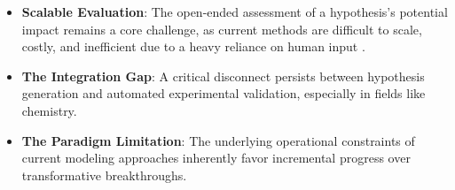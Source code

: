 \begin{itemize}
    \item \textbf{Scalable Evaluation}: The open-ended assessment of a hypothesis's potential impact remains a core challenge, as current methods are difficult to scale, costly, and inefficient due to a heavy reliance on human input \autocite{nie2025assessing}.
    \item \textbf{The Integration Gap}: A critical disconnect persists between hypothesis generation and automated experimental validation, especially in fields like chemistry.
    \item \textbf{The Paradigm Limitation}: The underlying operational constraints of current modeling approaches inherently favor incremental progress over transformative breakthroughs.
\end{itemize}

